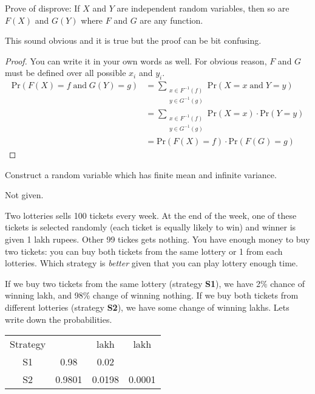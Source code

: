 \documentclass[a4paper,8pt,addpoints,solution]{exam}
\newcommand\PR{\text{Pr}}
\begin{document}
\begin{questions}
\question[5] Prove of disprove: If $X$ and $Y$ are independent random variables,
then so are $F(X)$ and $G(Y)$ where $F$ and $G$ are any function. 

\begin{solution}
    This sound obvious and it is true but the proof can be bit confusing. 
    \begin{proof}
        You can write it in your own words as well. For obvious reason, $F$ and $G$ must
        be defined over all possible $x_i$ and $y_i$.
        \begin{align}
            \PR\left(F(X)=f\;\text{and}\; G(Y)=g\right) 
                &= \sum\limits_{\substack{x\in F^{-1}(f) \\ y\in G^{-1}(g)}} \PR(X=x\;\text{and}\;Y=y) \\
                &= \sum\limits_{\substack{x\in F^{-1}(f) \\ y\in G^{-1}(g)}}
                    \PR(X=x)\cdot\PR(Y=y) \\
                &= \PR(F(X)=f) \cdot\PR(F(G)=g)
        \end{align}
    \end{proof}
\end{solution}

\bonusquestion[3] Construct a random variable which has finite mean and infinite
variance.
\begin{solution}
    Not given.
\end{solution}

\question[10]
Two lotteries sells 100 tickets every week. At the end of the week, one of these
tickets is selected randomly (each ticket is equally likely to win) and winner
is given 1 lakh rupees. Other 99 tickes gets nothing. You have enough money to
buy two tickets: you can buy both tickets from the same lottery or 1 from each
lotteries. Which strategy is \textit{better} given that you can play lottery enough
time.

\begin{solution} 
    If we buy two tickets from the same lottery (strategy \textbf{S1}), we have
    2\% chance of winning  lakh, and 98\% change of winning nothing.  If
    we buy both tickets from different lotteries (strategy \textbf{S2}), we have
    some change of winning  lakhs. Lets write down the probabilities.

    \begin{tabular}{c c c c}
        Strategy                    & \rupee 0     & \rupee 1 lakh & \rupee 2 lakh \\
        S1                          & 0.98         & 0.02          & \\
        S2                          & 0.9801       & 0.0198        & 0.0001 \\
    \end{tabular}


\end{solution}
\end{questions}
\end{document}
